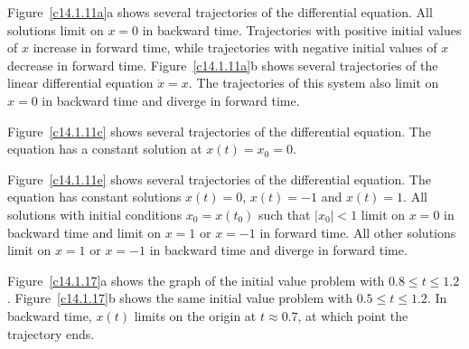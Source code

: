 \documentclass{ximera}
\begin{document}
 Figure~\ref{c14.1.11a}a shows several trajectories of the
differential equation.  All solutions limit on $x = 0$ in backward
time.  Trajectories with positive initial values of $x$ increase in
forward time, while trajectories with negative initial values of $x$
decrease in forward time.  Figure~\ref{c14.1.11a}b shows several trajectories
of the linear differential equation $\dot{x} = x$.  The trajectories of this
system also limit on $x = 0$ in backward time and diverge in forward time.

\begin{figure}[htb]
                       \centerline{%
                       }
\end{figure}

 Figure~\ref{c14.1.11c} shows several trajectories of the
differential equation.  The equation has a constant solution at $x(t)
= x_0 = 0$.

\begin{figure}[htb]
                       \centerline{%
                       }
\end{figure}

 Figure~\ref{c14.1.11e} shows several trajectories of the
differential equation.  The equation has constant solutions $x(t) = 0$,
$x(t) = -1$ and $x(t) = 1$.  All solutions with initial conditions
$x_0 = x(t_0)$ such that $|x_0| < 1$ limit on $x = 0$ in backward time and
limit on $x = 1$ or $x = -1$ in forward time.  All other solutions limit
on $x = 1$ or $x = -1$ in backward time and diverge in forward time.

\begin{figure}[htb]
                       \centerline{%
                       }
\end{figure}

 Figure~\ref{c14.1.17}a shows the graph of the initial
value problem with $0.8 \leq t \leq 1.2$.  Figure~\ref{c14.1.17}b shows
the same initial value problem with $0.5 \leq t \leq 1.2$.  In
backward time, $x(t)$ limits on the origin at $t \approx 0.7$, at
which point the trajectory ends.

\begin{figure}[htb]
                       \centerline{%
                       }
\end{figure}
\end{document}

